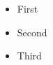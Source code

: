 \documentclass{ltx-talk}
\begin{document}
\begin{frame}
  \begin{itemize}[<+->]
    \item First
    \item Second
    \item Third
  \end{itemize}
\end{frame}
\end{document}
